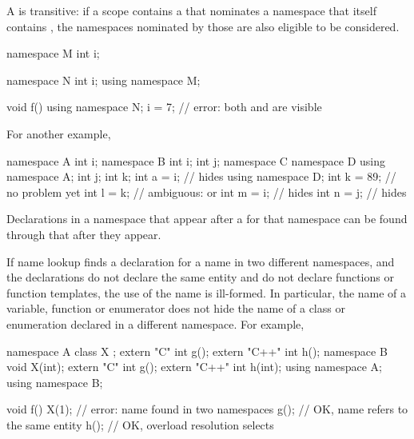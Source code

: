 \pnum
\begin{note}
A  is transitive: if a scope contains a
 that nominates a namespace that itself
contains , the namespaces nominated by those
 are also eligible to be considered.
\end{note}
\begin{example}
\begin{codeblock}
namespace M {
  int i;
}

namespace N {
  int i;
  using namespace M;
}

void f() {
  using namespace N;
  i = 7;            // error: both  and  are visible
}
\end{codeblock}

For another example,
\begin{codeblock}
namespace A {
  int i;
}
namespace B {
  int i;
  int j;
  namespace C {
    namespace D {
      using namespace A;
      int j;
      int k;
      int a = i;    //  hides 
    }
    using namespace D;
    int k = 89;     // no problem yet
    int l = k;      // ambiguous:  or 
    int m = i;      //  hides 
    int n = j;      //  hides 
  }
}
\end{codeblock}
\end{example}


\pnum
\begin{note}
Declarations in a namespace
that appear after a  for that namespace
can be found through that  after they appear.
\end{note}

\pnum
\begin{note}
If name lookup finds a declaration for a name in two different
namespaces, and the declarations do not declare the same entity and do
not declare functions or function templates, the use of the name is ill-formed.
In particular, the name of a variable, function or enumerator does not
hide the name of a class or enumeration declared in a different
namespace. For example,

\begin{codeblock}
namespace A {
  class X { };
  extern "C"   int g();
  extern "C++" int h();
}
namespace B {
  void X(int);
  extern "C"   int g();
  extern "C++" int h(int);
}
using namespace A;
using namespace B;

void f() {
  X(1);             // error: name  found in two namespaces
  g();              // OK, name  refers to the same entity
  h();              // OK, overload resolution selects 
}
\end{codeblock}
\end{note}

